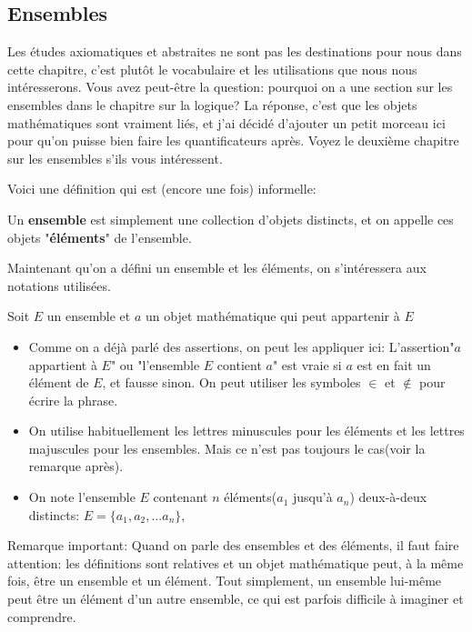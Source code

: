 \documentclass{article}
\begin{document}
\subsection{Ensembles}

Les études axiomatiques et abstraites ne sont pas les destinations pour nous dans cette chapitre, c'est plutôt le vocabulaire et les utilisations que nous nous intéresserons. Vous avez peut-être la question: pourquoi on a une section sur les ensembles dans le chapitre sur la logique? La réponse, c'est que les objets mathématiques sont vraiment liés, et j'ai décidé d'ajouter un petit morceau ici pour qu'on puisse bien faire les quantificateurs après. Voyez le deuxième chapitre sur les ensembles s'ils vous intéressent. 

Voici une définition qui est (encore une fois) informelle:

\begin{tcolorbox}[colback=red!5!white,colframe=red!75!black,title=Définition 1.2]
  Un \textbf{ensemble} est simplement une collection d'objets distincts, et on appelle ces objets "\textbf{éléments}" de l'ensemble.
\end{tcolorbox}

Maintenant qu'on a défini un ensemble et les éléments, on s'intéressera aux notations utilisées.

Soit $E$ un ensemble et $a$ un objet mathématique qui peut appartenir à $E$
\begin{itemize}
  \item Comme on a déjà parlé des assertions, on peut les appliquer ici: L'assertion"$a$ appartient à $E$" ou "l'ensemble $E$ contient $a$" est vraie si $a$ est en fait un élément de $E$, et fausse sinon. On peut utiliser les symboles $\in$ et $\notin$ pour écrire la phrase. 
  \item On utilise habituellement les lettres minuscules pour les éléments et les lettres majuscules pour les ensembles. Mais ce n'est pas toujours le cas(voir la remarque après).
  \item On note l'ensemble $E$ contenant $n$ éléments($a_1$ jusqu'à $a_n$) deux-à-deux distincts: $E=\{a_1, a_2, ... a_n\}$, 
\end{itemize}

Remarque important: Quand on parle des ensembles et des éléments, il faut faire attention: les définitions sont relatives et un objet mathématique peut, à la même fois, être un ensemble et un élément. Tout simplement, un ensemble lui-même peut être un élément d'un autre ensemble, ce qui est parfois difficile à imaginer et comprendre.
\end{document}
